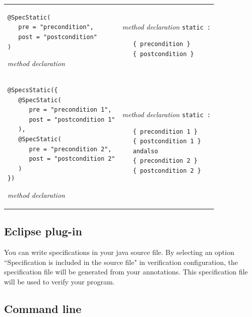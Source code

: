 \documentclass{article}
\begin{document}
\begin{longtable}{ m{7cm} | m{5cm} }
\begin{verbatim}
@SpecStatic(
   pre = "precondition", 
   post = "postcondition"
)
\end{verbatim}
\it{method declaration}
&
{\it method declaration} \texttt{static :}
\begin{verbatim}
   { precondition }
   { postcondition }
\end{verbatim}
\\
\begin{verbatim}
@SpecsStatic({
   @SpecStatic(
      pre = "precondition 1", 
      post = "postcondition 1"
   ),
   @SpecStatic(
      pre = "precondition 2", 
      post = "postcondition 2"
   )
})
\end{verbatim}
\it{method declaration}
&
{\it method declaration} \texttt{static :}
\begin{verbatim}
   { precondition 1 }
   { postcondition 1 }
   andalso
   { precondition 2 }
   { postcondition 2 }
\end{verbatim}
\end{longtable}

\subsection*{Eclipse plug-in}

You can write specifications in your java source file. By selecting an option ``Specification is included in the source file" in verification configuration, the specification file will be generated from your annotations. This specification file will be used to verify your program.

\subsection*{Command line}
\end{document}
